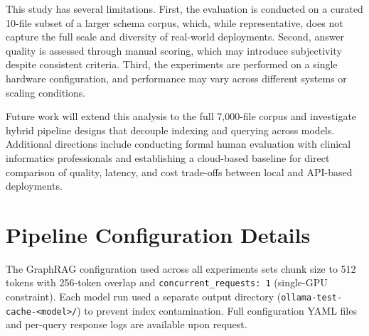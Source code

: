 \documentclass{article}
\begin{document}
This study has several limitations. First, the evaluation is conducted on a curated 10-file subset of a larger schema corpus, which, while representative, does not capture the full scale and diversity of real-world deployments. Second, answer quality is assessed through manual scoring, which may introduce subjectivity despite consistent criteria. Third, the experiments are performed on a single hardware configuration, and performance may vary across different systems or scaling conditions.

Future work will extend this analysis to the full 7{,}000-file corpus and investigate hybrid pipeline designs that decouple indexing and querying across models. Additional directions include conducting formal human evaluation with clinical informatics professionals and establishing a cloud-based baseline for direct comparison of quality, latency, and cost trade-offs between local and API-based deployments.



{\small


}


\appendix
\section{Pipeline Configuration Details}

The GraphRAG configuration used across all experiments sets chunk size to 512 tokens with
256-token overlap and \texttt{concurrent\_requests: 1} (single-GPU constraint). Each model
run used a separate output directory (\texttt{ollama-test-cache-<model>/}) to prevent index
contamination. Full configuration YAML files and per-query response logs are available upon
request.

\end{document}
